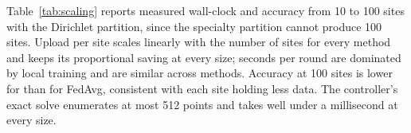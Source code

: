Table~\ref{tab:scaling} reports measured wall-clock and accuracy from 10 to 100 sites with the Dirichlet partition, since the specialty partition cannot produce 100 sites. Upload per site scales linearly with the number of sites for every method and \tierfed{} keeps its proportional saving at every size; seconds per round are dominated by local training and are similar across methods. Accuracy at 100 sites is lower for \tierfed{} than for FedAvg, consistent with each site holding less data. The controller's exact solve enumerates at most 512 points and takes well under a millisecond at every size.
